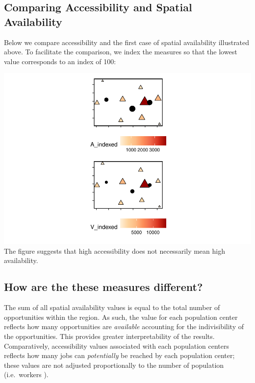 \documentclass[]{elsarticle} %
\begin{document}
\hypertarget{comparing-accessibility-and-spatial-availability}{%
\subsection{Comparing Accessibility and Spatial
Availability}\label{comparing-accessibility-and-spatial-availability}}

Below we compare accessibility and the first case of spatial
availability illustrated above. To facilitate the comparison, we index
the measures so that the lowest value corresponds to an index of 100:

\includegraphics[width=1\linewidth]{Spatial-Availability_files/figure-latex/indexed-measures-comparison-1}
The figure suggests that high accessibility does not necessarily mean
high availability.

\hypertarget{how-are-the-these-measures-different}{%
\subsection{How are the these measures
different?}\label{how-are-the-these-measures-different}}

The sum of all spatial availability values is equal to the total number
of opportunities within the region. As such, the value for each
population center reflects how many opportunities are \emph{available}
accounting for the indivisibility of the opportunities. This provides
greater interpretability of the results. Comparatively, accessibility
values associated with each population centers reflects how many jobs
can \emph{potentially} be reached by each population center; these
values are not adjusted proportionally to the number of population
(i.e.~workers ).
\end{document}
